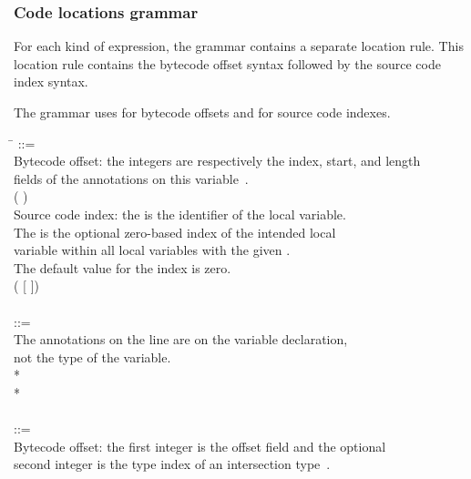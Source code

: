 \documentclass{article}
\begin{document}
\subsubsection{Code locations grammar\label{code-grammar}}

For each kind of expression, the grammar contains a separate location rule.
This location rule contains the bytecode offset syntax followed by the
source code index syntax.

The grammar uses \bnflit{\#} for bytecode offsets and \bnflit{*} for source code indexes.

\begin{tabbing}
\qquad \= \kill
{} ::= \\
\qquad    \bnfcmt Bytecode offset: the integers are respectively the index, start, and length \\
\qquad    \bnfcmt fields of the annotations on this variable~\cite{JSR308-webpage-201110}. \\
\qquad    ( \bnflit{\#}  \bnflit{+} ) \\
\qquad    \bnfcmt Source code index: the  is the identifier of the local variable. \\
\qquad    \bnfcmt The  is the optional zero-based index of the intended local \\
\qquad    \bnfcmt variable within all local variables with the given . \\
\qquad    \bnfcmt The default value for the index is zero. \\
\qquad    \bnfor{} ( [\bnflit{*} ]) \\
\\
 ::= \\
\qquad    \bnfcmt The annotations on the  line are on the variable declaration, \\
\qquad    \bnfcmt not the type of the variable. \\
\qquad    {}  \bnflit{:} * \lineend \\
\qquad    {}* \\
\\
 ::= \\
\qquad    \bnfcmt Bytecode offset: the first integer is the offset field and the optional \\
\qquad    \bnfcmt second integer is the type index of an intersection type~\cite{JSR308-webpage-201110}. \\

\end{tabbing}
\end{document}
